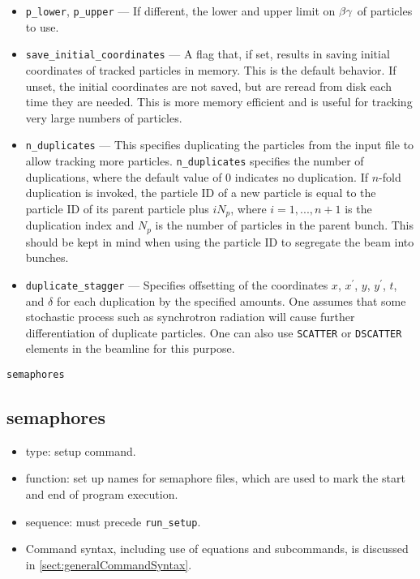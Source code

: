 \documentclass[11pt]{article}
\begin{document}
\begin{itemize}
\item \verb|p_lower|, \verb|p_upper| --- If different, the lower and upper limit on ${\rm \beta\gamma}$ of particles to use.
\item \verb|save_initial_coordinates| --- A flag that, if set, results in saving initial coordinates
of tracked particles in memory.  This is the default behavior.  If unset, the initial coordinates
are not saved, but are reread from disk each time they are needed.  This is more memory efficient
and is useful for tracking very large numbers of particles.
\item \verb|n_duplicates| --- This specifies duplicating the particles from the input file to allow tracking more
  particles.   \verb|n_duplicates| specifies the number of duplications, where the default value of 0 indicates no duplication.
  If $n$-fold duplication is invoked, the particle ID of a new particle is equal to the particle ID of its parent particle plus
  $i N_p$, where $i=1,...,n+1$ is the duplication index and $N_p$ is the number of particles in the parent bunch.
  This should be kept in mind when using the particle ID to segregate the beam into bunches.
\item \verb|duplicate_stagger| --- Specifies offsetting of the coordinates $x$, $x^\prime$, $y$, $y^\prime$, $t$, and $\delta$
  for each duplication by the specified amounts.
  One assumes that some stochastic process such as synchrotron radiation will cause further differentiation of duplicate particles.
  One can also use \verb|SCATTER| or \verb|DSCATTER| elements in the beamline for this purpose.
\end{itemize}

\newpage
\begin{center}{\Large\verb|semaphores|}\end{center}
\subsection{semaphores \label{subsec:semaphores}}

\begin{itemize}
\item type: setup command.
\item function: set up names for semaphore files, which are used to mark the
        start and end of program execution.
\item sequence: must precede \verb|run_setup|.
\item Command syntax, including use of equations and subcommands, is discussed in \ref{sect:generalCommandSyntax}.
\end{itemize}
\end{document}
